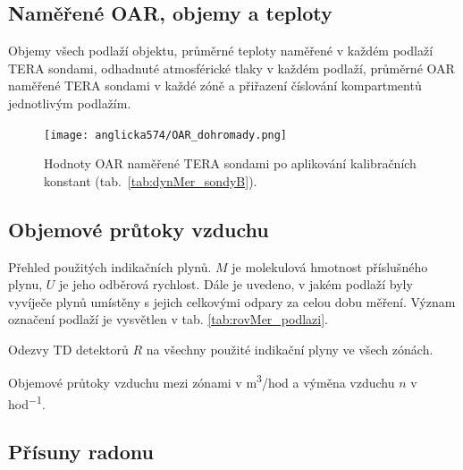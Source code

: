 \subsection{Naměřené OAR, objemy a teploty}

\begin{table}[H]
    \centering
    \caption{Objemy všech podlaží objektu, průměrné teploty naměřené v každém podlaží TERA sondami, odhadnuté atmosférické tlaky v každém podlaží, průměrné OAR naměřené TERA sondami v každé zóně a přiřazení číslování kompartmentů jednotlivým podlažím.}
    \label{tab:anglicka574_objemy}
    
\end{table}
\begin{figure}[H]
    \centering
    \texttt{[image: anglicka574/OAR\_dohromady.png]}
    \caption{Hodnoty OAR naměřené TERA sondami po aplikování kalibračních konstant (tab.~\ref{tab:dynMer_sondyB}).}
    \label{fig:anglicka574_OARdohromady}
\end{figure}

\subsection{Objemové průtoky vzduchu}

\begin{table}[H]
    \centering
    \caption{Přehled použitých indikačních plynů. $M$ je molekulová hmotnost příslušného plynu, $U$ je jeho odběrová rychlost. Dále je uvedeno, v jakém podlaží byly vyvíječe plynů umístěny s jejich celkovými odpary za celou dobu měření. Význam označení podlaží je vysvětlen v tab. \ref{tab:rovMer_podlazi}.}
    \label{tab:anglicka574_indikacniPlyny}
    
\end{table}
\begin{table}[H]
    \centering
    \caption{Odezvy TD detektorů $R$ na všechny použité indikační plyny ve všech zónách.}
    \label{tab:anglicka574_odezvyTD}
    
\end{table}

\begin{table}[H]
    \centering
    \caption{Objemové průtoky vzduchu mezi zónami v \si{m^3/hod} a výměna vzduchu $n$ v \si{hod^{-1}}.}
    \label{tab:anglicka574_prutoky}
    
\end{table}
\subsection{Přísuny radonu}

